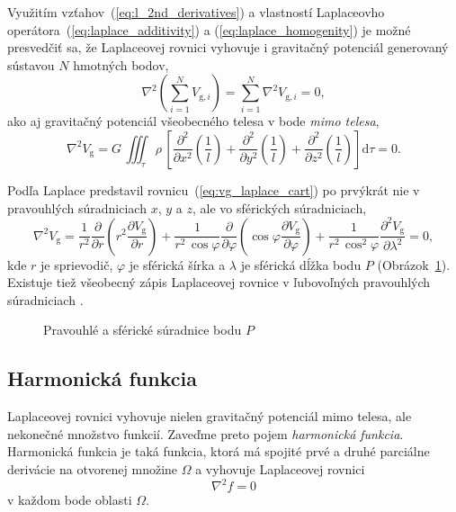 \documentclass[a4paper, 12pt]{book}
\newcommand{\diff}{\mathrm d}
\newcommand{\gidx}{\mathrm g}
\begin{document}
Využitím vzťahov~(\ref{eq:l_2nd_derivatives}) a vlastností Laplaceovho 
operátora~(\ref{eq:laplace_additivity}) a (\ref{eq:laplace_homogenity}) je 
možné presvedčiť sa, že Laplaceovej rovnici vyhovuje i gravitačný potenciál 
generovaný sústavou $N$ hmotných bodov,
%
\begin{equation}
\nabla^2 \left( \sum_{i = 1}^N V_{\gidx,i} \right) = \sum_{i = 1}^N \nabla^2 
V_{\gidx,i} = 0{,}
\end{equation}
%
ako aj gravitačný potenciál všeobecného telesa v bode \emph{mimo telesa},
%
\begin{equation}
\nabla^2 V_\gidx = G\, \iiint_\tau \rho \, \left[ \frac{\partial^2}{\partial 
x^2}\left(\frac{1}{l}\right) + \frac{\partial^2}{\partial 
y^2}\left(\frac{1}{l}\right) + \frac{\partial^2}{\partial 
z^2}\left(\frac{1}{l}\right) \right] \diff\tau = 0{.}
\end{equation}

Podľa \cite{MacMillan1930} Laplace predstavil 
rovnicu~(\ref{eq:vg_laplace_cart}) po prvýkrát nie v pravouhlých súradniciach 
$x$, $y$ a $z$, ale vo sférických súradniciach,
%
\begin{equation}
\label{eq:vg_laplace_sph}
\nabla^2 V_\gidx = \frac{1}{r^2} \frac{\partial}{\partial r} \left( r^2 
\frac{\partial V_\gidx}{\partial r} \right) + \frac{1}{r^2 \, \cos\varphi} 
\frac{\partial}{\partial \varphi} \left( \cos\varphi \frac{\partial 
V_\gidx}{\partial \varphi} \right) + \frac{1}{r^2 \, 
\cos^2\varphi}\frac{\partial^2 V_\gidx}{\partial \lambda^2} = 0{,}
\end{equation}
%
kde $r$ je sprievodič, $\varphi$ je sférická šírka a $\lambda$ je sférická 
dĺžka bodu $P$ (Obrázok~\ref{fig:cart_sph}).  Existuje tiež všeobecný zápis 
Laplaceovej rovnice v ľubovoľných pravouhlých súradniciach \citep[pozri 
napríklad][]{MoritzPhysicalGeodesy}.

\begin{figure}
\centering

\caption{Pravouhlé a sférické súradnice bodu $P$}
\label{fig:cart_sph}
\end{figure}






\subsection{Harmonická funkcia}

Laplaceovej rovnici vyhovuje nielen gravitačný potenciál mimo telesa, ale 
nekonečné množstvo funkcií.  Zaveďme preto pojem \emph{harmonická funkcia}.  
Harmonická funkcia je taká funkcia, ktorá má spojité prvé a druhé parciálne 
derivácie na otvorenej množine $\Omega$ a vyhovuje Laplaceovej rovnici
%
\begin{equation}
\nabla^2 f = 0
\end{equation}
%
v každom bode oblasti $\Omega$.
\end{document}
